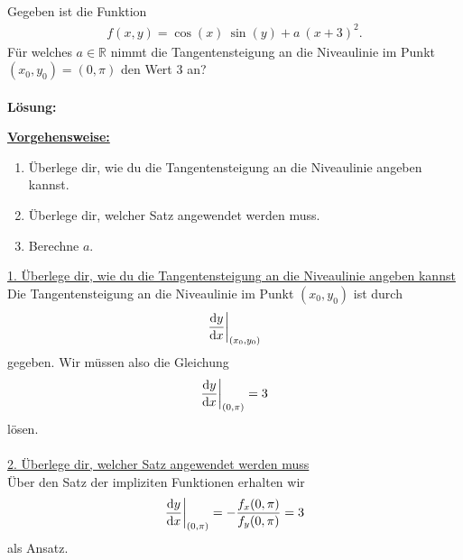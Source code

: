 \newpage

\subsection*{}
Gegeben ist die Funktion
\begin{align*}
f(x,y) = \cos(x) \ \sin(y) + a \ (x+3)^2.
\end{align*}
Für welches $a \in \mathbb{R}$ nimmt die Tangentensteigung
an die Niveaulinie im Punkt $(x_0,y_0) = ( 0, \pi) $
den Wert $3$ an?\\
\\ 
\textbf{Lösung:}
\begin{mdframed}
\underline{\textbf{Vorgehensweise:}}
\begin{enumerate}
\item Überlege dir, wie du die Tangentensteigung an die Niveaulinie angeben kannst.

\item Überlege dir, welcher Satz angewendet werden muss.

\item Berechne $a$.

   
\end{enumerate}
\end{mdframed}

\underline{1. Überlege dir, wie du die Tangentensteigung an die Niveaulinie angeben kannst}\\
Die Tangentensteigung an die Niveaulinie im Punkt $(x_0,y_0)$
ist durch
\begin{align*}
\frac{\text{\rmfamily d} y}{\text{\rmfamily d} x} \bigg|_{(x_0,y_0)}
\end{align*}
gegeben.
Wir müssen also die Gleichung
\begin{align*}
\frac{\text{\rmfamily d} y}{\text{\rmfamily d} x} \bigg|_{(0,\pi)} =  3
\end{align*}
lösen.\\
\\

\underline{2. Überlege dir, welcher Satz angewendet werden muss}\\
Über den Satz der impliziten Funktionen erhalten wir
\begin{align*}
\frac{\text{\rmfamily d} y}{\text{\rmfamily d} x} \bigg|_{(0,\pi)} 
=
-\frac{f_x(0,\pi)}{f_y(0,\pi)} =3
\end{align*}
als Ansatz.
\\
\\

